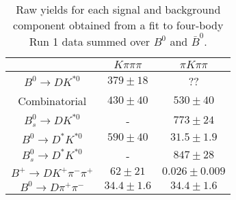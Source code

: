 \begin{table}
  \centering
  \begin{tabular}{ccc}
      \toprule
       & $K\pi\pi\pi$ & $\pi K\pi\pi$ \\
      \midrule
      $B^0 \to DK^{*0}$ & $379 \pm 18$ & ?? \\
      Combinatorial & $430 \pm 40$ & $530 \pm 40$ \\
      $B^0_s \to DK^{*0}$ & \-- & $773 \pm 24$ \\
      $B^0 \to D^*K^{*0}$ & $590 \pm 40$ & $31.5 \pm 1.9$ \\
      $B^0_s \to D^*K^{*0}$ & \-- & $847 \pm 28$ \\
      $B^+ \to DK^+\pi^-\pi^+$ & $62 \pm 21$ & $0.026 \pm 0.009$ \\
      $B^0 \to D\pi^+\pi^-$ & $34.4 \pm 1.6$ & $34.4 \pm 1.6$ \\
      \bottomrule
      \end{tabular}
  \caption{Raw yields for each signal and background component obtained from a fit to four-body Run 1 data summed over $B^0$ and $\bar{B}^0$.}
\label{tab:yields_combined_4body_run1}
\end{table}
